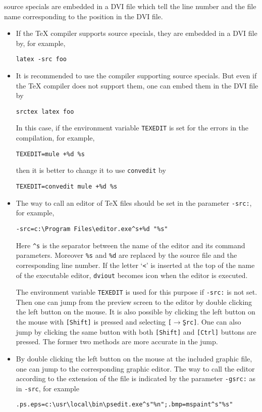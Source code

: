 \documentclass{article}
\begin{document}
source specials are embedded in a DVI file which tell the line number and the 
file name corresponding to the position in the DVI file.

\begin{itemize}
\item
If the {\TeX} compiler supports source specials, they are embedded in a DVI 
file by, for example,
\begin{verbatim}
latex -src foo
\end{verbatim}

\item
It is recommended to use the compiler supporting source specials.
But even if the {\TeX} compiler does not support them, one can embed them in 
the DVI file by
\begin{verbatim}
srctex latex foo
\end{verbatim}
In this case, if the environment variable {\tt TEXEDIT} is set for the errors 
in the compilation, for example,
\begin{verbatim}
TEXEDIT=mule +%d %s
\end{verbatim}
then it is better to change it to use {\tt convedit} by
\begin{verbatim}
TEXEDIT=convedit mule +%d %s
\end{verbatim}

\item
The way to call an editor of {\TeX} files should be set in the parameter 
{\tt -src:}, for example,
\begin{verbatim}
-src=c:\Program Files\editor.exe^s+%d "%s"
\end{verbatim}
Here \verb|^s| is the separator between the name of the editor and its command
parameters. 
Moreover \verb|%s| and \verb|%d| are  replaced by the source file and the 
corresponding line number.
If the letter `{\tt <}' is inserted at the top of the name of the 
executable editor, {\tt dviout} becomes icon when the editor is executed.

The environment variable {\tt TEXEDIT} is used for this purpose if {\tt -src:} 
is not set.
Then one can jump from the preview screen to the editor by double clicking 
the left button on the mouse. 
It is also possible by clicking the left button on the mouse 
with {\tt [Shift]} is pressed and selecting {\tt [$\to$\b{S}rc]}. 
One can also jump by clicking the same button with both {\tt [Shift]} 
and {\tt [Ctrl]} buttons are pressed.  
The former two methods are more accurate in the jump.

\item
By double clicking the left button on the mouse at the included graphic file,
one can jump to the corresponding graphic editor.
The way to call the editor according to the extension of the file 
is indicated by the parameter {\tt-gsrc:} as in {\tt-src}, for example
\begin{verbatim}
.ps.eps=c:\usr\local\bin\psedit.exe^s"%n";.bmp=mspaint^s"%s"
\end{verbatim}


\end{itemize}
\end{document}
